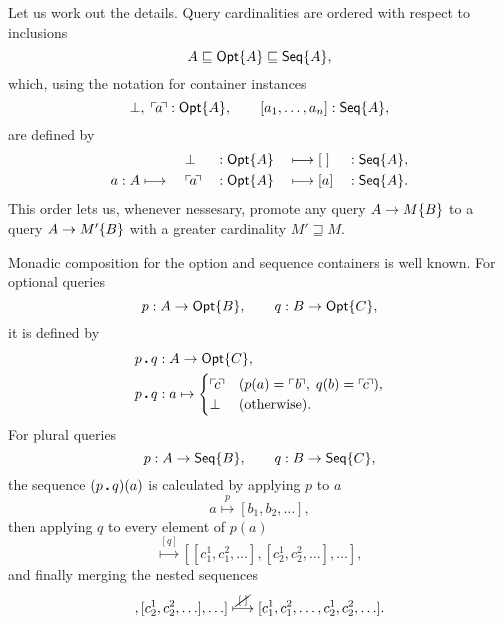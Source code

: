 Let us work out the details.  Query cardinalities are ordered with respect to
inclusions
\begin{equation*}
    A \sqsubseteq \mathsf{Opt}{\left\{A\right\}} \sqsubseteq \mathsf{Seq}{\left\{A\right\}},
\end{equation*}
which, using the notation for container instances
\begin{equation*}
    \bot,\; \ulcorner\!a\!\urcorner : \mathsf{Opt}{\left\{A\right\}}, \qquad [a_1,\ldots,a_n] : \mathsf{Seq}{\left\{A\right\}},
\end{equation*}
are defined by
\begin{alignat*}{5}
    & \; && \bot && : \mathsf{Opt}{\left\{A\right\}} && \longmapsto [\;] && : \mathsf{Seq}{\left\{A\right\}}, \\
    & a : A \longmapsto\ && \ulcorner\!a\!\urcorner && : \mathsf{Opt}{\left\{A\right\}} && \longmapsto [a] && : \mathsf{Seq}{\left\{A\right\}}.
\end{alignat*}
This order lets us, whenever nessesary, promote any query $A\to M{\left\{B\right\}}$ to
a query $A\to M'{\left\{B\right\}}$ with a greater cardinality $M' \sqsupseteq M$.

Monadic composition for the option and sequence containers is well known.  For
optional queries
\begin{equation*}
    p : A \to \mathsf{Opt}{\left\{B\right\}}, \qquad q : B \to \mathsf{Opt}{\left\{C\right\}},
\end{equation*}
it is defined by
\begin{align*}
    & p\,\boldsymbol{.}\,q : A \to \mathsf{Opt}{\left\{C\right\}}, \\
    & p\,\boldsymbol{.}\,q : a \mapsto \begin{cases}
        \ulcorner\!c\!\urcorner & (p(a)=\ulcorner\!\,b\!\urcorner,\; q(b)=\ulcorner\!c\!\urcorner), \\
        \bot & (\text{otherwise}).
    \end{cases}
\end{align*}
For plural queries
\begin{equation*}
    p : A \to \mathsf{Seq}{\left\{B\right\}}, \qquad q : B \to \mathsf{Seq}{\left\{C\right\}},
\end{equation*}
the sequence $(p\,\boldsymbol{.}\,q)(a)$ is calculated by applying $p$ to $a$
\begin{equation*}
    a \overset{p}{\longmapsto} [b_1, b_2, \ldots],
\end{equation*}
then applying $q$ to every element of $p(a)$
\begin{equation*}
    [b_1, b_2, \ldots]
    \overset{[q]}{\longmapsto}
    [[c^{1}_{1}, c^{2}_{1}, \ldots], [c^{1}_{2}, c^{2}_{2}, \ldots], \ldots],
\end{equation*}
and finally merging the nested sequences
\begin{equation*}
    [[c^{1}_{1}, c^{2}_{1}, \ldots], [c^{1}_{2}, c^{2}_{2}, \ldots], \ldots]
    \overset{\cancel{\,[\;]\,}}{\longmapsto}
    [c^{1}_{1}, c^{2}_{1}, \ldots, c^{1}_{2}, c^{2}_{2}, \ldots].
\end{equation*}

